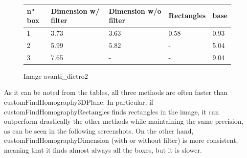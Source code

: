 \documentclass{article}
\begin{document}
\begin{figure}[H]
    \centering
   \begin{tabularx}{\textwidth}{||X X X X X||} 
        \hline
     n° box & Dimension w/ filter & Dimension w/o filter & Rectangles & base \\ [0.5ex]
     \hline\hline
     1 & 3.73 & 3.63 & 0.58 & 0.93 \\ 
     \hline
     2 & 5.99 & 5.82 & - & 5.04 \\
     \hline
     3 & 7.65 & - & - & 9.04 \\
     \hline
    \end{tabularx}
     \caption{Image avanti\_dietro2}
\end{figure}

As it can be noted from the tables, all three methods are often faster than customFindHomography3DPlane. In particular, if customFindHomographyRectangles finds rectangles in the image, it can outperform drastically the other methods while maintaining the same precision, as can be seen in the following screenshots.
On the other hand, customFindHomographyDimension (with or without filter) is more consistent, meaning that it finds almost always all the boxes, but it is slower.
\end{document}
